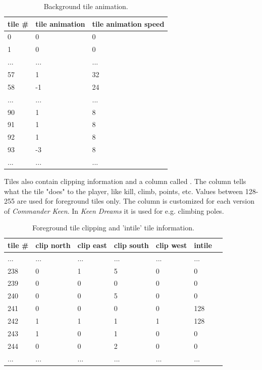 \documentclass[book.tex]{subfiles}
\begin{document}
 \begin{table}[H]
  \begin{tabularx}{\textwidth}[c]{XXX}
  \hline
  \textbf{tile \#} & \textbf{tile animation} & \textbf{tile animation speed}   \\ \hline
  0             & 0          & 0    \\
  1             & 0          & 0    \\
  ...             & ...          & ...    \\
  57             & 1          & 32    \\
  58             & -1          & 24    \\
  ...             & ...          & ...    \\
  90             & 1          & 8    \\
  91            & 1          & 8    \\
  92             & 1          & 8    \\
  93             & -3          & 8    \\
  ...             & ...          & ...    \\
  \end{tabularx}
  \caption{Background tile animation.}
  \label{table:background tile anim}
  \end{table}
  
  \par
Tiles also contain clipping information and a column called . The  column tells what the tile "does" to the player, like kill, climb, points, etc. Values between 128-255 are used for foreground tiles only. The  column is customized for each version of \textit{Commander Keen}. In \textit{Keen Dreams} it is used for e.g. climbing poles.\\
\begin{table}[H]
  \begin{tabularx}{\textwidth}[c]{XXXXXXX}
  \hline
  \textbf{tile \#} & \textbf{clip north} & \textbf{clip east} & \textbf{clip south} & \textbf{clip west}  & \textbf{intile} \\ \hline
  ...    & ...     & ...    & ...   & ...     & ...      \\
  238    & 0       & 1      & 5     & 0       & 0        \\
  239    & 0       & 0      & 0     & 0       & 0        \\
  240    & 0       & 0      & 5     & 0       & 0        \\
  241    & 0       & 0      & 0     & 0       & 128       \\
  242    & 1       & 1      & 1     & 1       & 128       \\
  243    & 1       & 0      & 1     & 0       & 0       \\
  244    & 0       & 0      & 2     & 0       & 0       \\
  ...    & ...     & ...    & ...   & ...     & ...     \\
  \end{tabularx}
  \caption{Foreground tile clipping and 'intile' tile information.}
  \end{table}
\end{document}
